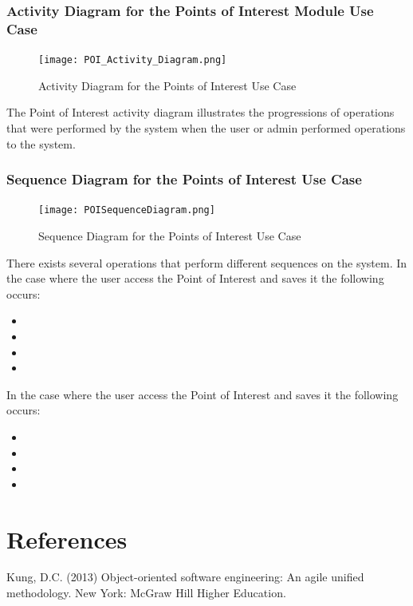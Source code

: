 \documentclass[runningheads,a4paper]{article}
\begin{document}
\subsubsection {Activity Diagram for the Points of Interest Module Use Case}
 	\begin{figure}[H]
   	\centering
   	\texttt{[image: POI\_Activity\_Diagram.png]}
   	\caption{Activity Diagram for the Points of Interest Use Case}
	\end{figure}
	
	The Point of Interest activity diagram illustrates the progressions of operations that were performed by the system when the user or admin performed operations to the system. 
	
	
	
	
	
	 
\subsubsection {Sequence Diagram for the Points of Interest Use Case}
 	\begin{figure}[H]
   	\centering
   	\texttt{[image: POISequenceDiagram.png]}
   	\caption{Sequence Diagram for the Points of Interest Use Case}
	\end{figure}
	There exists several operations that perform different sequences on the system.
	In the case where the user access the Point of Interest and saves it the following occurs:
	\begin{itemize}
		\item  
		\item
		\item
		\item
	\end{itemize}
	
	In the case where the user access the Point of Interest and saves it the following occurs:
	\begin{itemize}
		\item  
		\item
		\item
		\item
	\end{itemize}
	


\section{References}

Kung, D.C. (2013) Object-oriented software engineering: An agile unified methodology. New York: McGraw Hill Higher Education.
\end{document}
